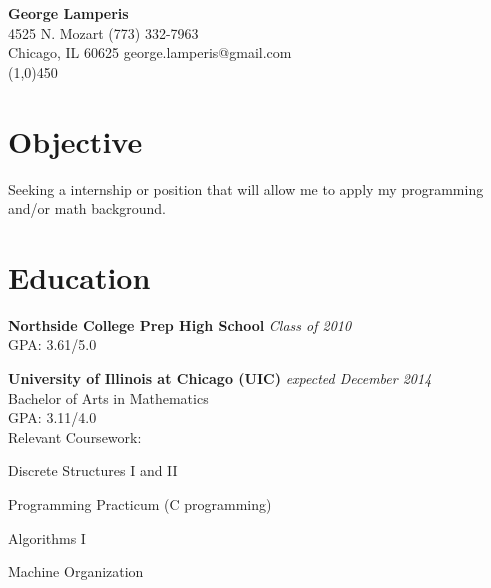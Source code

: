 \documentclass[letterpaper]{article}
\begin{document}
\begin{center}
    \textbf{\LARGE{George Lamperis}} \\
    4525 N. Mozart      \hfill  (773) 332-7963  \\
    Chicago, IL 60625   \hfill  george.lamperis@gmail.com \\
    \line(1,0){450}
\end{center}

\section*{Objective}
Seeking a internship or position that will allow me to apply my programming 
and/or math background.

\section*{Education}
\textbf{Northside College Prep High School} \hfill \emph{Class of 2010} \\
GPA: 3.61/5.0

\textbf{University of Illinois at Chicago (UIC)} \hfill \emph{expected December 2014} \\
Bachelor of Arts in Mathematics \\
GPA: 3.11/4.0 \\
Relevant Coursework:
\vspace{-1ex}
\begin{compactitem}
    \item Discrete Structures I and II
    \item Programming Practicum (C programming)
    \item Algorithms I
    \item Machine Organization
\end{compactitem}


\end{document}
